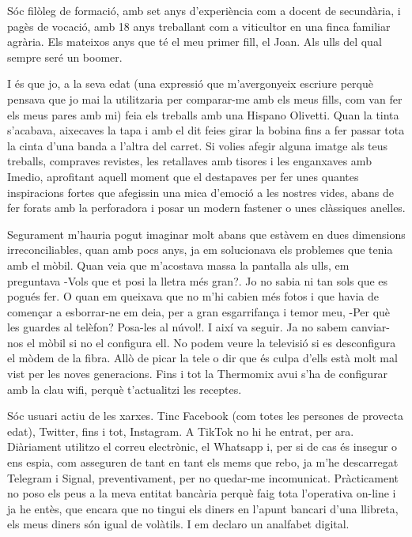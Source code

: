 

Sóc filòleg de formació, amb set anys d'experiència com a docent de secundària, i pagès de vocació, amb 18 anys treballant com a viticultor en una finca familiar agrària. Els mateixos anys que té el meu primer fill, el Joan. Als ulls del qual sempre seré un boomer.

I és que jo, a la seva edat (una expressió que m'avergonyeix escriure perquè pensava que jo mai la utilitzaria per comparar-me amb els meus fills, com van fer els meus pares amb mi) feia els treballs amb una Hispano Olivetti. Quan la tinta s'acabava, aixecaves la tapa i amb el dit feies girar la bobina fins a fer passar tota la cinta d'una banda a l'altra del carret. Si volies afegir alguna imatge als teus treballs, compraves revistes, les retallaves amb tisores i les enganxaves amb Imedio, aprofitant aquell moment que el destapaves per fer unes quantes inspiracions fortes que afegissin una mica d'emoció a les nostres vides, abans de fer forats amb la perforadora i posar un modern fastener o unes clàssiques anelles.

Segurament m'hauria pogut imaginar molt abans que estàvem en dues dimensions irreconciliables, quan amb pocs anys, ja em solucionava els problemes que tenia amb el mòbil. Quan veia que m'acostava massa la pantalla als ulls, em preguntava -Vols que et posi la lletra més gran?. Jo no sabia ni tan sols que es pogués fer. O quan em queixava que no m'hi cabien més fotos i que havia de començar a esborrar-ne em deia, per a gran esgarrifança i temor meu, -Per què les guardes al telèfon? Posa-les al núvol!. I així va seguir. Ja no sabem canviar-nos el mòbil si no el configura ell. No podem veure la televisió si es desconfigura el mòdem de la fibra. Allò de picar la tele o dir que és culpa d'ells està molt mal vist per les noves generacions. Fins i tot la Thermomix avui s'ha de configurar amb la clau wifi, perquè t'actualitzi les receptes.

Sóc usuari actiu de les xarxes. Tinc Facebook (com totes les persones de provecta edat), Twitter, fins i tot, Instagram. A TikTok no hi he entrat, per ara. Diàriament utilitzo el correu electrònic, el Whatsapp i, per si de cas és insegur o ens espia, com asseguren de tant en tant els mems que rebo, ja m'he descarregat Telegram i Signal, preventivament, per no quedar-me incomunicat. Pràcticament no poso els peus a la meva entitat bancària perquè faig tota l'operativa on-line i ja he entès, que encara que no tingui els diners en l'apunt bancari d'una llibreta, els meus diners són igual de volàtils. I em declaro un analfabet digital.

